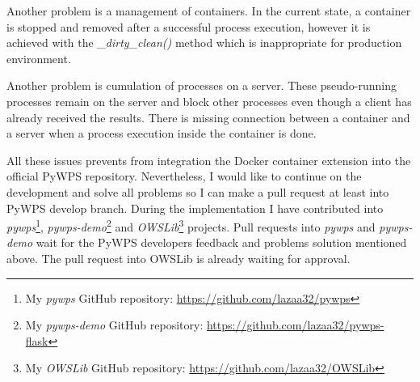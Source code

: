 Another problem is a management of containers. In the current state, a
container is stopped and removed after a successful process execution,
however it is achieved with the \textit{\_dirty\_clean()} method which
is inappropriate for production environment.

Another problem is cumulation of processes on a server. These
pseudo-running processes remain on the server and block other
processes even though a client has already received the results. There
is missing connection between a container and a server when a process
execution inside the container is done.

All these issues prevents from integration the Docker container
extension into the official PyWPS repository.  Nevertheless, I would
like to continue on the development and solve all problems so I can
make a pull request at least into PyWPS develop branch. During the
implementation I have contributed into \textit{pywps}\footnote{My
  \textit{pywps} GitHub repository:
  \url{https://github.com/lazaa32/pywps}},
\textit{pywps-demo}\footnote{My \textit{pywps-demo} GitHub repository:
  \url{https://github.com/lazaa32/pywps-flask}} and
\textit{OWSLib}\footnote{My \textit{OWSLib} GitHub repository:
  \url{https://github.com/lazaa32/OWSLib}} projects. Pull requests
into \textit{pywps} and \textit{pywps-demo} wait for the PyWPS
developers feedback and problems solution mentioned above. The pull
request into OWSLib is already waiting for approval.
